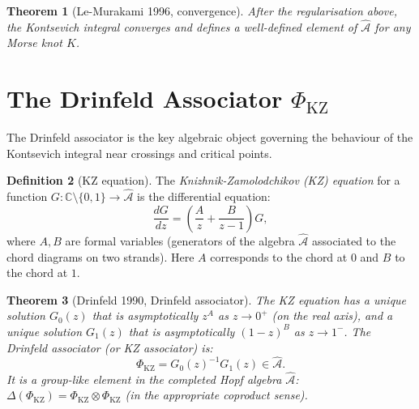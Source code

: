 \documentclass[12pt,a4paper]{amsart}
\newtheorem{theorem}{Theorem}[section]
\theoremstyle{definition}
\newtheorem{definition}[theorem]{Definition}
\newcommand{\C}{\mathbb{C}}
\begin{document}
\begin{theorem}[Le-Murakami 1996, convergence]\label{thm:convergence}
After the regularisation above, the Kontsevich integral converges and
defines a well-defined element of $\hat{\mathcal{A}}$ for any Morse knot
$K$.
\end{theorem}

\section{The Drinfeld Associator $\Phi_{\mathrm{KZ}}$}\label{sec:associator}

The Drinfeld associator is the key algebraic object governing the behaviour
of the Kontsevich integral near crossings and critical points.

\begin{definition}[KZ equation]
The \emph{Knizhnik-Zamolodchikov (KZ) equation} for a function $G: \C\setminus\{0,1\} \to \hat{\mathcal{A}}$ is the differential equation:
\[
  \frac{dG}{dz} = \left(\frac{A}{z} + \frac{B}{z-1}\right) G,
\]
where $A, B$ are formal variables (generators of the algebra $\hat{\mathcal{A}}$
associated to the chord diagrams on two strands).  Here $A$ corresponds to
the chord at $0$ and $B$ to the chord at $1$.
\end{definition}

\begin{theorem}[Drinfeld 1990, Drinfeld associator]\label{thm:drinfeld}
The KZ equation has a unique solution $G_0(z)$ that is asymptotically
$z^A$ as $z \to 0^+$ (on the real axis), and a unique solution $G_1(z)$
that is asymptotically $(1-z)^B$ as $z \to 1^-$.  The \emph{Drinfeld
associator} (or \emph{KZ associator}) is:
\[
  \Phi_{\mathrm{KZ}} = G_0(z)^{-1} G_1(z) \in \hat{\mathcal{A}}.
\]
It is a group-like element in the completed Hopf algebra $\hat{\mathcal{A}}$:
$\Delta(\Phi_{\mathrm{KZ}}) = \Phi_{\mathrm{KZ}} \otimes \Phi_{\mathrm{KZ}}$
(in the appropriate coproduct sense).
\end{theorem}
\end{document}
